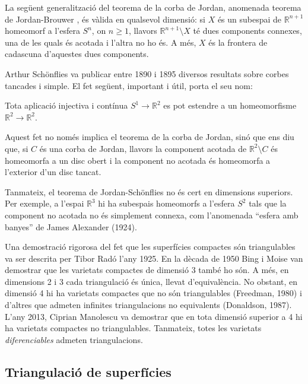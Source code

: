 \documentclass[../main.tex]{subfiles}
\begin{document}
La següent generalització del teorema de la corba de Jordan, anomenada teorema de Jordan-Brouwer \label{ter:teoremadejordanbrouwer}, és vàlida en qualsevol dimensió: si $X$ és un subespai de $\mathbb{R}^{n+1}$ homeomorf a l'esfera $S^n$, on $n\geq 1$, llavors $\mathbb{R}^{n+1}\setminus X$ té dues components connexes, una de les quals és acotada i l'altra no ho és. A més, $X$ és la frontera de cadascuna d'aquestes dues components. 

Arthur Schönflies va publicar entre 1890 i 1895 diversos resultats sobre corbes tancades i simple. El fet següent, important i útil, porta el seu nom:

\begin{ter}
\label{ter:teoremadejordanschonflies}  Tota aplicació injectiva i contínua $S^1\rightarrow \mathbb{R}^2$ es pot estendre a un homeomorfisme $\mathbb{R}^2\rightarrow \mathbb{R}^2$.
\end{ter}

Aquest fet no només implica el teorema de la corba de Jordan, sinó que ens diu que, si $C$ és una corba de Jordan, llavors la component acotada de $\mathbb{R}^2\setminus C$ és homeomorfa a un disc obert i la component no acotada és homeomorfa a l'exterior d'un disc tancat.

Tanmateix, el teorema de Jordan-Schönflies no és cert en dimensions superiors. Per exemple, a l'espai $\mathbb{R}^3$ hi ha subespais homeomorfs a l'esfera $S^2$ tals que la component no acotada no és simplement connexa, com l'anomenada ``esfera amb banyes'' de James Alexander (1924).

Una demostració rigorosa del fet que les superfícies compactes són triangulables va ser descrita per Tibor Radó l'any 1925. En la dècada de 1950 Bing i Moise van demostrar que les varietats compactes de dimensió 3 també ho són. A més, en dimensions 2 i 3 cada triangulació és única, llevat d'equivalència. No obstant, en dimensió 4 hi ha varietats compactes que no són triangulables (Freedman, 1980) i d'altres que admeten infinites triangulacions no equivalents (Donaldson, 1987). L'any 2013, Ciprian Manolescu va demostrar que en tota dimensió superior a 4 hi ha varietats compactes no triangulables. Tanmateix, totes les varietats \textit{diferenciables} admeten triangulacions. 

\subsection{Triangulació de superfícies}
\end{document}

